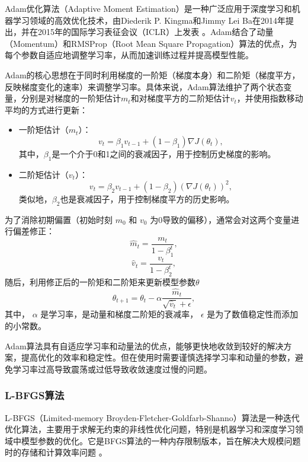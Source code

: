 Adam优化算法（Adaptive Moment Estimation）是一种广泛应用于深度学习和机器学习领域的高效优化技术，由Diederik P. Kingma和Jimmy Lei Ba在2014年提出，并在2015年的国际学习表征会议（ICLR）上发表 \cite{kingma2014adam}。Adam结合了动量（Momentum）和RMSProp（Root Mean Square Propagation）算法的优点，为每个参数自适应地调整学习率，从而加速训练过程并提高模型性能。

Adam的核心思想在于同时利用梯度的一阶矩（梯度本身）和二阶矩（梯度平方，反映梯度变化的速率）来调整学习率。具体来说，Adam算法维护了两个状态变量，分别是对梯度的一阶矩估计$m_t$和对梯度平方的二阶矩估计$v_t$，并使用指数移动平均的方式进行更新：
\begin{itemize}
    \item 一阶矩估计（$ m_t $）：
    \begin{equation}v_t=\beta_1v_{t-1}+(1-\beta_1)\nabla J(\theta_t),\end{equation}
    其中，$\beta_1$是一个介于0和1之间的衰减因子，用于控制历史梯度的影响。
    \item 二阶矩估计（$ v_t $）：
    \begin{equation}v_t=\beta_2v_{t-1}+(1-\beta_2)(\nabla J(\theta_t))^2,\end{equation}
    类似地，$\beta_2$也是衰减因子，用于控制梯度平方的历史影响。
\end{itemize}
为了消除初期偏置（初始时刻 $m_0$ 和 $v_0$ 为0导致的偏移），通常会对这两个变量进行偏差修正：
\begin{equation}\hat{m}_t=\frac{m_t}{1-\beta_1^t},\end{equation}
\begin{equation}\hat{v}_t=\frac{v_t}{1-\beta_2^t},\end{equation}
随后，利用修正后的一阶矩和二阶矩来更新模型参数$ \theta $
\begin{equation}\theta_{t+1}=\theta_t-\alpha\frac{\hat{m}_t}{\sqrt{\hat{v}_t}+\epsilon},\end{equation}
其中， $\alpha$ 是学习率，是动量和梯度二阶矩的衰减率， $\epsilon$ 是为了数值稳定性而添加的小常数。

Adam算法具有自适应学习率和动量法的优点，能够更快地收敛到较好的解决方案，提高优化的效率和稳定性。但在使用时需要谨慎选择学习率和动量的参数，避免学习率过高导致震荡或过低导致收敛速度过慢的问题。

\subsubsection{L-BFGS算法}

L-BFGS（Limited-memory Broyden-Fletcher-Goldfarb-Shanno）算法是一种迭代优化算法，主要用于求解无约束的非线性优化问题，特别是机器学习和深度学习领域中模型参数的优化。它是BFGS算法的一种内存限制版本，旨在解决大规模问题时的存储和计算效率问题 \cite{liu1989limited}。

